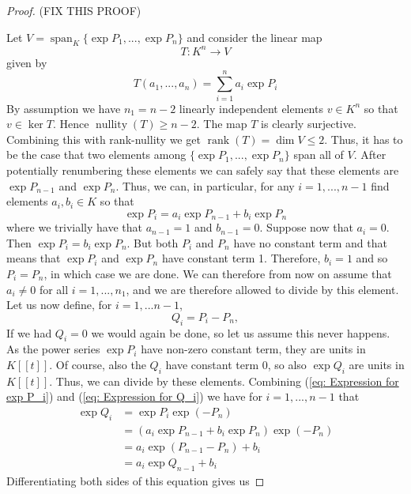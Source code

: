 \documentclass{article}
\DeclareMathOperator{\rank}{rank}
\DeclareMathOperator{\nullity}{nullity}
\newcommand{\Span}{\operatorname{span}}
\begin{document}
\begin{proof}
    (FIX THIS PROOF)
    
    Let $V = \Span_K \{ \exp P_1,...,\exp P_n\}$ and consider the linear map $$T : K^n \to V$$ given by 
    $$T(a_1, ..., a_n) = \sum_{i=1}^n a_i \exp P_i$$
    By assumption we have $n_1 = n - 2$ linearly independent elements $v \in K^n$ so that $v \in \ker T$. Hence $\nullity (T) \geq n-2$. The map $T$ is clearly surjective. Combining this with rank-nullity we get $\rank (T) = \dim V \leq 2$. Thus, it has to be the case that two elements among $\{\exp P_1,...,\exp P_n \}$ span all of $V$. After potentially renumbering these elements we can safely say that these elements are $\exp{P_{n-1}}$ and $\exp{P_{n}}$. Thus, we can, in particular, for any $i = 1, ..., n-1$ find elements $a_i, b_i \in K$ so that 
    \begin{equation} \label{eq: Expression for exp P_i}
        \exp P_i = a_i \exp P_{n-1} + b_i \exp P_n
    \end{equation}
    where we trivially have that $a_{n-1} = 1$ and $b_{n-1} = 0$. 
    Suppose now that $a_i = 0$. Then $\exp P_i = b_i \exp P_n$. But both $P_i$ and $P_n$ have no constant term and that means that $\exp P_i$ and $\exp P_n$ have constant term 1. Therefore, $b_i = 1$ and so $P_i = P_n$, in which case we are done. We can therefore from now on assume that $a_i \neq 0$ for all $i = 1, ..., n_1$, and we are therefore allowed to divide by this element. Let us now define, for $i = 1, ... n-1$,
    \begin{equation}\label{eq: Expression for Q_i}
        Q_i = P_i - P_n,
    \end{equation}
    If we had $Q_i = 0$ we would again be done, so let us assume this never happens. As the power series $\exp P_i$ have non-zero constant term, they are units in $K[[t]]$. Of course, also the $Q_i$ have constant term 0, so also $\exp Q_i$ are units in $K[[t]]$. Thus, we can divide by these elements. Combining (\ref{eq: Expression for exp P_i}) and (\ref{eq: Expression for Q_i}) we have for $i = 1, ..., n-1$ that
    \begin{align*}
        \exp Q_i &= \exp P_i \exp (-P_n) \\
        &= (a_i \exp P_{n-1} + b_i \exp P_n) \exp (-P_n) \\
        &= a_i \exp (P_{n-1} - P_n) + b_i \\
        &= a_i \exp Q_{n-1} + b_i
    \end{align*}
    Differentiating both sides of this equation gives us

\end{proof}
\end{document}
